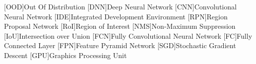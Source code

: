 \begin{acronym}[IEEE]
	[OOD]{Out Of Distribution}
	[DNN]{Deep Neural Network}
	[CNN]{Convolutional Neural Network}
	[IDE]{Integrated Development Environment}
	[RPN]{Region Proposal Network}
	[RoI]{Region of Interest}
	[NMS]{Non-Maximum Suppression}
	[IoU]{Intersection over Union}
	[FCN]{Fully Convolutional Neural Network}
	[FC]{Fully Connected Layer}
	[FPN]{Feature Pyramid Network}
	[SGD]{Stochastic Gradient Descent}
	[GPU]{Graphics Processing Unit}
\end{acronym}
